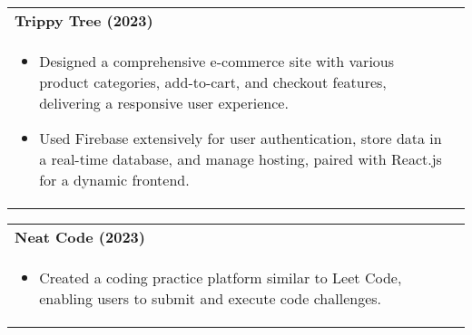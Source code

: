 \documentclass[a4paper,8pt]{article}
\begin{document}
\begin{tabularx}{\linewidth}{ @{}l r@{} }
\textbf{{ Trippy Tree (2023)}} \hfill \color[HTML]{371e77} \\[1pt]
\begin{minipage}[t]{\linewidth}
    \begin{itemize}[nosep,after=\strut, leftmargin=2em, itemsep=2pt]
        \item Designed a comprehensive e-commerce site with various product categories, add-to-cart, and checkout features, delivering a responsive user experience.
        \item Used Firebase extensively for user authentication, store data in a real-time database, and manage hosting, paired with React.js for a dynamic frontend.
    \end{itemize}
\end{minipage}
\end{tabularx}

\begin{tabularx}{\linewidth}{ @{}l r@{} }
\textbf{{ Neat Code (2023)}} \hfill \color[HTML]{371e77} \\[1pt]
\begin{minipage}[t]{\linewidth}
    \begin{itemize}[nosep,after=\strut, leftmargin=2em, itemsep=2pt]
        \item Created a coding practice platform similar to Leet Code, enabling users to submit and execute code challenges.
    \end{itemize}
\end{minipage}
\end{tabularx}
\end{document}
